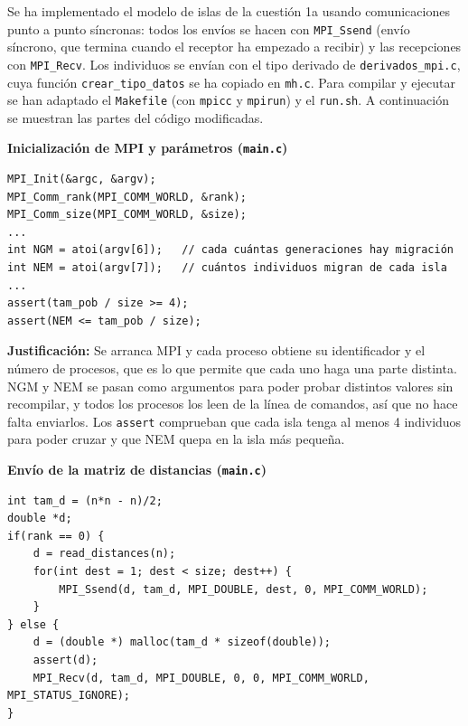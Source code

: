 \documentclass[12pt]{article}
\begin{document}
\begin{enumerate}


Se ha implementado el modelo de islas de la cuestión 1a usando comunicaciones punto a punto síncronas: todos los envíos se hacen con \texttt{MPI\_Ssend} (envío síncrono, que termina cuando el receptor ha empezado a recibir) y las recepciones con \texttt{MPI\_Recv}. Los individuos se envían con el tipo derivado de \texttt{derivados\_mpi.c}, cuya función \texttt{crear\_tipo\_datos} se ha copiado en \texttt{mh.c}. Para compilar y ejecutar se han adaptado el \texttt{Makefile} (con \texttt{mpicc} y \texttt{mpirun}) y el \texttt{run.sh}. A continuación se muestran las partes del código modificadas.


\medskip
\noindent\textbf{Inicialización de MPI y parámetros (\texttt{main.c})}\par
\smallskip

\begin{lstlisting}[style=EstiloC]
MPI_Init(&argc, &argv);
MPI_Comm_rank(MPI_COMM_WORLD, &rank);
MPI_Comm_size(MPI_COMM_WORLD, &size);
...
int NGM = atoi(argv[6]);   // cada cuántas generaciones hay migración
int NEM = atoi(argv[7]);   // cuántos individuos migran de cada isla
...
assert(tam_pob / size >= 4);
assert(NEM <= tam_pob / size);
\end{lstlisting}

\textbf{Justificación:} Se arranca MPI y cada proceso obtiene su identificador y el número de procesos, que es lo que permite que cada uno haga una parte distinta. NGM y NEM se pasan como argumentos para poder probar distintos valores sin recompilar, y todos los procesos los leen de la línea de comandos, así que no hace falta enviarlos. Los \texttt{assert} comprueban que cada isla tenga al menos 4 individuos para poder cruzar y que NEM quepa en la isla más pequeña.

\vspace{0.5cm}


\medskip
\noindent\textbf{Envío de la matriz de distancias (\texttt{main.c})}\par
\smallskip

\begin{lstlisting}[style=EstiloC]
int tam_d = (n*n - n)/2;
double *d;
if(rank == 0) {
	d = read_distances(n);
	for(int dest = 1; dest < size; dest++) {
		MPI_Ssend(d, tam_d, MPI_DOUBLE, dest, 0, MPI_COMM_WORLD);
	}
} else {
	d = (double *) malloc(tam_d * sizeof(double));
	assert(d);
	MPI_Recv(d, tam_d, MPI_DOUBLE, 0, 0, MPI_COMM_WORLD, MPI_STATUS_IGNORE);
}
\end{lstlisting}


\end{enumerate}
\end{document}

